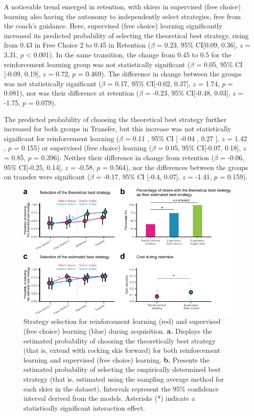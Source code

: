 A noticeable trend emerged in retention, with skiers in supervised (free choice) learning also having the autonomy to independently select strategies, free from the coach's guidance. Here, supervised (free choice) learning significantly increased its predicted probability of selecting the theoretical best strategy, rising from 0.43 in Free Choice 2 to 0.45 in Retention ($\beta$ = 0.23, 95\% CI[0.09, 0.36], $z$ = 3.31, $p$ < 0.001). In the same transition, the change from 0.45 to 0.5 for the reinforcement learning group was not statistically significant ($\beta$ = 0.05, 95\% CI [-0.09, 0.19], $z$ = 0.72, $p$ = 0.469). The difference in change between the groups was not statistically significant ($\beta$ = 0.17, 95\% CI[-0.02,  0.37], $z$ = 1.74, $p$ = 0.081), nor was their difference at retention ($\beta$ = -0.23, 95\% CI[-0.48, 0.03], $z$ = -1.75, $p$ = 0.079).

The predicted probability of choosing the theoretical best strategy further increased for both groups in Transfer, but this increase was not statistically significant for reinforcement learning ($\beta$ = 0.11 , 95\% CI [ -0.04 ,  0.27 ], $z$ = 1.42 , $p$  =  0.155) or supervised (free choice) learning ($\beta$ = 0.05, 95\% CI[-0.07, 0.18], $z$ = 0.85, $p$ = 0.396). Neither their difference in change from retention ($\beta$ = -0.06, 95\% CI[-0.25, 0.14], $z$ = -0.58, $p$  =  0.564), nor the differences between the groups on transfer were significant ($\beta$ = -0.17, 95\% CI [-0.4, 0.07], $z$ = -1.41, $p$ = 0.159).


\begin{figure}[H]
\centering
\includegraphics{figures/figure_choice_estimated_4.pdf}
\caption{Strategy selection for reinforcement learning (red) and supervised (free choice) learning (blue) during acquisition. \textbf{a.} Displays the estimated probability of choosing the theoretically best strategy (that is, extend with rocking skis forward) for both reinforcement learning and supervised (free choice) learning. \textbf{b.} Presents the estimated probability of selecting the empirically determined best strategy (that is, estimated using the sampling average method for each skier in the dataset). Intervals represent the 95\% confidence interval derived from the models. Asterisks (*) indicate a statistically significant interaction effect.}\label{fig: choice_estimated}
\end{figure}

